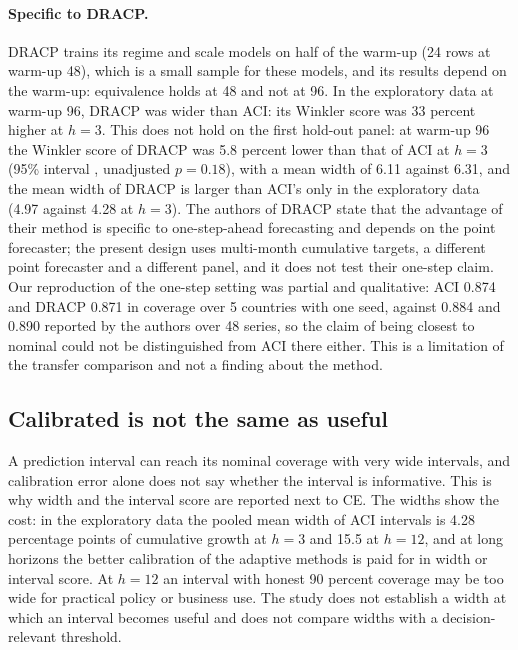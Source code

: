 \paragraph{Specific to DRACP.} DRACP trains its regime and scale models on half of the warm-up (24 rows at warm-up 48), which is a small sample for these models, and its results depend on the warm-up: equivalence holds at 48 and not at 96. In the exploratory data at warm-up 96, DRACP was wider than ACI: its Winkler score was 33 percent higher at $h=3$. This does not hold on the first hold-out panel: at warm-up 96 the Winkler score of DRACP was 5.8 percent lower than that of ACI at $h=3$ (95\% interval , unadjusted $p=0.18$), with a mean width of 6.11 against 6.31, and the mean width of DRACP is larger than ACI's only in the exploratory data (4.97 against 4.28 at $h=3$). The authors of DRACP state that the advantage of their method is specific to one-step-ahead forecasting and depends on the point forecaster; the present design uses multi-month cumulative targets, a different point forecaster and a different panel, and it does not test their one-step claim. Our reproduction of the one-step setting was partial and qualitative: ACI 0.874 and DRACP 0.871 in coverage over 5 countries with one seed, against 0.884 and 0.890 reported by the authors over 48 series, so the claim of being closest to nominal could not be distinguished from ACI there either. This is a limitation of the transfer comparison and not a finding about the method.

\subsection{Calibrated is not the same as useful}

A prediction interval can reach its nominal coverage with very wide intervals, and calibration error alone does not say whether the interval is informative. This is why width and the interval score are reported next to CE. The widths show the cost: in the exploratory data the pooled mean width of ACI intervals is 4.28 percentage points of cumulative growth at $h=3$ and 15.5 at $h=12$, and at long horizons the better calibration of the adaptive methods is paid for in width or interval score. At $h=12$ an interval with honest 90 percent coverage may be too wide for practical policy or business use. The study does not establish a width at which an interval becomes useful and does not compare widths with a decision-relevant threshold.


